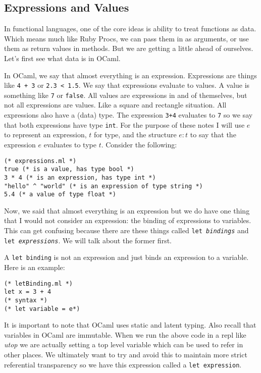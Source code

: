\documentclass[main.tex]{subfiles}
\begin{document}
\subsection{Expressions and Values}
In functional languages, one of the core ideas is ability to treat functions as data. Which means much like Ruby Procs, we can pass them in as arguments, or use them as return values in methods. But we are getting a little ahead of ourselves. Let's first see what data is in OCaml. 

In OCaml, we say that almost everything is an expression. Expressions are things like \texttt{4 + 3} or \texttt{2.3 < 1.5}.
We say that expressions evaluate to values. A value is something like \texttt{7} or \texttt{false}. All values are expressions in and of themselves, but not all expressions are values. Like a square and rectangle situation. All expressions also have a (data) type. The expression \texttt{3+4} evaluates to \texttt{7} so we say that both expressions have type \texttt{int}.
For the purpose of these notes I will use $e$ to represent an expression, $t$ for type, and the structure $e:t$ to say that the expression $e$ evaluates to type $t$. Consider the following:
\begin{lstlisting}[style=Myocamlstyle]
(* expressions.ml *)
true (* is a value, has type bool *)
3 * 4 (* is an expression, has type int *)
"hello" ^ "world" (* is an expression of type string *)
5.4 (* a value of type float *)
\end{lstlisting}
Now, we said that almost everything is an expression but we do have one thing that I would not consider an expression: the binding of expressions to variables. This can get confusing because there are these things called \texttt{let \textit{bindings}} and \texttt{let \textit{expressions}}. We will talk about the former first. 

A \texttt{let binding} is not an expression and just binds an expression to a variable. Here is an example:
\begin{lstlisting}[style=Myocamlstyle]
(* letBinding.ml *)
let x = 3 + 4
(* syntax *)
(* let variable = e*)
\end{lstlisting}
It is important to note that OCaml uses static and latent typing. Also recall that variables in OCaml are immutable. When we run the above code in a repl like \textit{utop} we are actually setting a top level variable which can be used to refer in other places. We ultimately want to try and avoid this to maintain more strict referential transparency so we have this expression called a \texttt{let expression}. 
\end{document}
